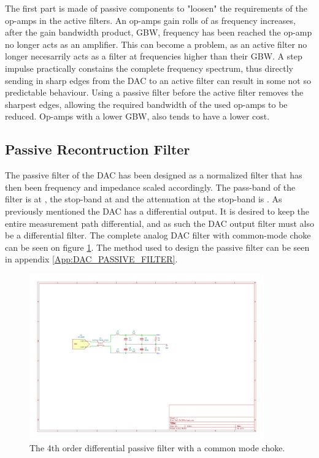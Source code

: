 The first part is made of passive components to "loosen" the requirements of the op-amps in the active filters. An op-amps gain rolls of as frequency increases, after the gain bandwidth product, GBW, frequency has been reached the op-amp no longer acts as an amplifier. This can become a problem, as an active filter no longer necesarrily acts as a filter at frequencies higher than their GBW. A step impulse practically constains the complete frequency spectrum, thus directly sending in sharp edges from the DAC to an active filter can result in some not so predictable behaviour. Using a passive filter before the active filter removes the sharpest edges, allowing the required bandwidth of the used op-amps to be reduced. Op-amps with a lower GBW, also tends to have a lower cost.

\subsection*{Passive Recontruction Filter}
The passive filter of the DAC has been designed as a normalized filter that has then been frequency and impedance scaled accordingly. The pass-band of the filter is at , the stop-band at  and the attenuation at the stop-band is . As previously mentioned the DAC has a differential output. It is desired to keep the entire measurement path differential, and as such the DAC output filter must also be a differential filter. The complete analog DAC filter with common-mode choke can be seen on figure \ref{fig_7_1_1_DAC_PASSIVE}. The method used to design the passive filter can be seen in appendix \ref{App:DAC_PASSIVE_FILTER}.

\begin{figure}[H]
    \centering
    \includegraphics[clip, trim=150 300 250 200, width=0.9\textwidth]{Sections/7_SystemDesign/Figures/7_1_1_DAC_PASSIVE_FILTER.pdf}
    \caption{The 4th order differential passive filter with a common mode choke.}
    \label{fig_7_1_1_DAC_PASSIVE}
\end{figure}

